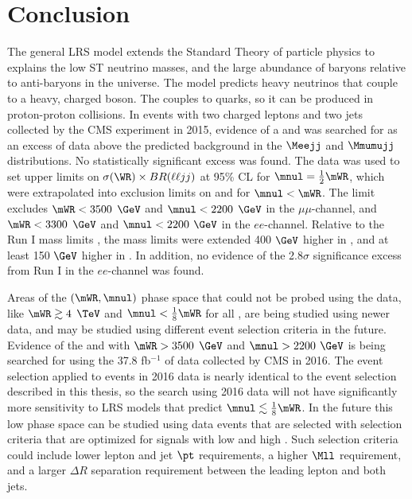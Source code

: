 \chapter{Conclusion}
\label{conclusion_chapter}
The general LRS model extends the Standard Theory of particle physics to explains the low ST neutrino masses, and the large 
abundance of baryons relative to anti-baryons in the universe.  The model predicts heavy neutrinos \nul that couple to a heavy, 
charged \WR boson.  The \WR couples to quarks, so it can be produced in proton-proton collisions.  In events with two charged 
leptons and two jets collected by the CMS experiment in 2015, evidence of a \WR and \nul was searched for as an excess of data 
above the predicted background in the $\Meejj$ and $\Mmumujj$ distributions.  No statistically significant excess was found.  
The data was used to set upper limits on $\sigma(\WR) \times BR(\ell\ell jj)$ at 95\% CL for $\mnul = \frac{1}{2}\mWR$, which 
were extrapolated into exclusion limits on \mWR and \mnul for $\mnul < \mWR$.  The limit excludes $\mWR < 3500$ 
$\GeV$ and $\mnul < 2200$ $\GeV$ in the $\mu\mu$-channel, and $\mWR < 3300$ $\GeV$ and $\mnul < 2200$ $\GeV$ in the $ee$-channel.  
Relative to the Run I mass limits \cite{cmsWRRunOneResults}, the mass limits were extended 400 $\GeV$ higher in \mWR, and at least 
150 $\GeV$ higher in \mnul.  In addition, no evidence of the 2.8$\sigma$ significance excess from Run I in the $ee$-channel was found.

Areas of the $(\mWR, \mnul)$ phase space that could not be probed using the data, like $\mWR \gtrsim 4$ $\TeV$ and $\mnul < 
\frac{1}{8}\mWR$ for all \mWR, are being studied using newer data, and may be studied using different event selection criteria in 
the future.  Evidence of the \WR and \nul with $\mWR > 3500$ $\GeV$ and $\mnul > 2200$ $\GeV$ is being searched for using the 37.8 
fb$^{-1}$ of data \cite{lumi} collected by CMS in 2016.  The event selection applied to events in 2016 data is nearly identical to 
the event selection described in this thesis, so the search using 2016 data will not have significantly more sensitivity to LRS models 
that predict $\mnul \lesssim \frac{1}{8}\mWR$.  In the future this low \mnul phase space can be studied using data events that 
are selected with selection criteria that are optimized for signals with low \mnul and high \mWR.  Such selection criteria could 
include lower lepton and jet $\pt$ requirements, a higher $\Mll$ requirement, and a larger $\Delta R$ separation requirement between 
the leading lepton and both jets.


